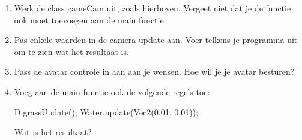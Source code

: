 \begin{exercise}
\begin{enumerate}
	\item Werk de class gameCam uit, zoals hierboven. Vergeet niet dat je de  functie ook moet toevoegen aan de main  functie.
	\item Pas enkele waarden in de camera update aan. Voer telkens je programma uit om te zien wat het resultaat is.
	\item Pass de avatar controle in  aan aan je wensen. Hoe wil je je avatar besturen?
	\item Voeg aan de main  functie ook de volgende regels toe:
	
	\begin{code}
	D.grassUpdate();
  Water.update(Vec2(0.01, 0.01));
	\end{code}
	
	Wat is het resultaat?
\end{enumerate}
\end{exercise}











